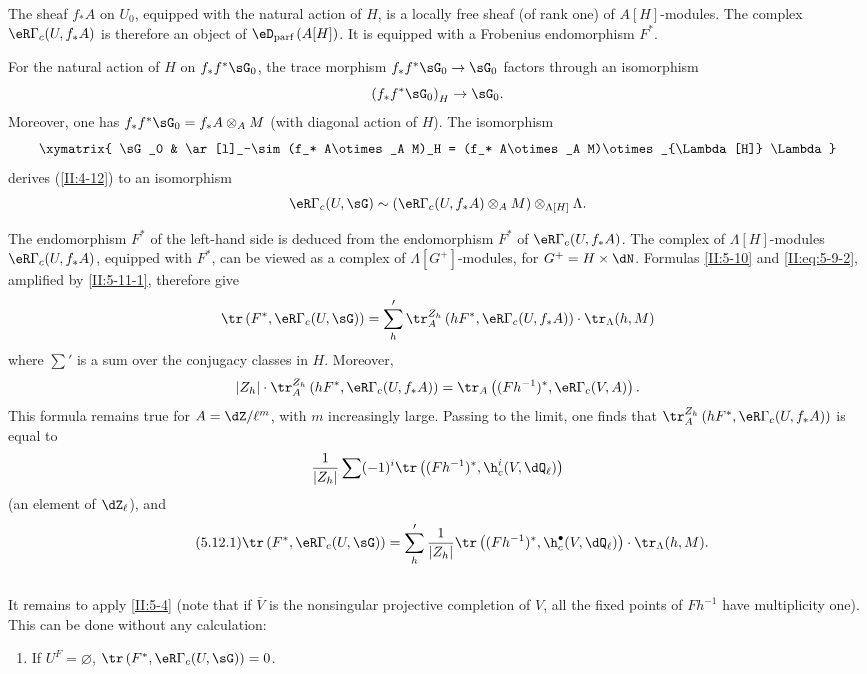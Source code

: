 \documentclass[oneside]{book}
\begin{document}
The sheaf $f_* A$ on $U_0$, equipped with the natural action of $H$, is a
locally free sheaf (of rank one) of $A[H]$-modules. The complex
$\eR\Gamma_c(U,f_* A)$ is therefore an object of
$\eD_\text{parf}\left(A[H]\right)$. It is equipped with a Frobenius
endomorphism $F^*$.

For the natural action of $H$ on $f_* f^*\sG_0$, the trace morphism
$f_* f^*\sG_0\to\sG_0$ factors through an isomorphism
\[
  \left(f_* f^*\sG_0\right)_H \to \sG_0 \text{.}
\]
Moreover, one has $f_* f^*\sG_0=f_* A\otimes_A M$ (with diagonal action of
$H$). The isomorphism
\[\xymatrix{
  \sG_0
    & \ar[l]_-\sim (f_* A\otimes_A M)_H = (f_* A\otimes_A M)\otimes_{\Lambda[H]} \Lambda
}\]
derives (\ref{II:4-12}) to an isomorphism
\[
  \eR\Gamma_c(U,\sG) \sim \left(\eR\Gamma_c(U,f_* A)\otimes_A M\right)\otimes_{\Lambda[H]} \Lambda \text{.}
\]

The endomorphism $F^*$ of the left-hand side is deduced from the
endomorphism $F^*$ of $\eR\Gamma_c(U,f_* A)$. The complex of
$\Lambda[H]$-modules $\eR\Gamma_c(U,f_* A)$, equipped with $F^*$, can be
viewed as a complex of $\Lambda[G^+]$-modules, for $G^+=H\times \dN$.
Formulas \ref{II:5-10} and \eqref{II:eq:5-9-2}, amplified by
\ref{II:5-11-1}, therefore give
\[
  \tr\left(F^*,\eR\Gamma_c(U,\sG)\right) = \sum_h' \tr_A^{Z_h}\left(h F^*,\eR\Gamma_c(U,f_* A)\right)\cdot \tr_\Lambda(h,M)
\]
where $\sum'$ is a sum over the conjugacy classes in $H$. Moreover,
\[
  |Z_h|\cdot \tr_A^{Z_h}\left(h F^*,\eR\Gamma_c(U,f_* A)\right) = \tr_A\left((F h^{-1})^*,\eR\Gamma_c(V,A)\right) \text{.}
\]
This formula remains true for $A=\dZ/\ell^m$, with $m$ increasingly large.
Passing to the limit, one finds that
$\tr_A^{Z_h}\left(h F^*,\eR\Gamma_c(U,f_* A)\right)$ is equal to
\[
  \frac{1}{|Z_h|} \sum (-1)^i \tr\left((F h^{-1})^*,\h_c^i(V,\dQ_\ell)\right)
\]
(an element of $\dZ_\ell$), and
\begin{equation*}\tag{5.12.1}\label{II:eq:5-12-1}
\tr\left(F^*,\eR\Gamma_c(U,\sG)\right) = \sum_h' \frac{1}{|Z_h|} \tr\left((F h^{-1})^*,\h_c^\bullet(V,\dQ_\ell)\right)\cdot \tr_\Lambda(h,M) \text{.}
\end{equation*}






\subsection{}\label{II:5-13}

It remains to apply \ref{II:5-4} (note that if $\bar V$ is the nonsingular
projective completion of $V$, all the fixed points of $F h^{-1}$ have
multiplicity one). This can be done without any calculation:
\begin{enumerate}[\indent A.]
  \item If $U^F=\varnothing$,
    $\tr\left(F^*,\eR\Gamma_c(U,\sG)\right) = 0$. \end{enumerate}
\end{document}
